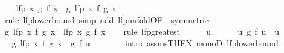 \begin{isabellebody}
\ \ \isamarkupfalse%
\ {\isachardoublequoteopen}lfp\ {\isacharparenleft}{\kern0pt}{\isasymlambda}x{\isachardot}{\kern0pt}\ g\ {\isacharparenleft}{\kern0pt}f\ x{\isacharparenright}{\kern0pt}{\isacharparenright}{\kern0pt}\ {\isasymle}\ g\ {\isacharparenleft}{\kern0pt}lfp\ {\isacharparenleft}{\kern0pt}{\isasymlambda}x{\isachardot}{\kern0pt}\ f\ {\isacharparenleft}{\kern0pt}g\ x{\isacharparenright}{\kern0pt}{\isacharparenright}{\kern0pt}{\isacharparenright}{\kern0pt}{\isachardoublequoteclose}\isanewline
\ \ \ \ \isamarkupfalse%
\ {\isacharparenleft}{\kern0pt}rule\ lfp{\isacharunderscore}{\kern0pt}lowerbound{\isacharparenright}{\kern0pt}\ {\isacharparenleft}{\kern0pt}simp\ add{\isacharcolon}{\kern0pt}\ lfp{\isacharunderscore}{\kern0pt}unfold{\isacharbrackleft}{\kern0pt}OF\ {\isacharasterisk}{\kern0pt}{\isacharcomma}{\kern0pt}\ symmetric{\isacharbrackright}{\kern0pt}{\isacharparenright}{\kern0pt}\isanewline
\ \ \isamarkupfalse%
\ {\isachardoublequoteopen}g\ {\isacharparenleft}{\kern0pt}lfp\ {\isacharparenleft}{\kern0pt}{\isasymlambda}x{\isachardot}{\kern0pt}\ f\ {\isacharparenleft}{\kern0pt}g\ x{\isacharparenright}{\kern0pt}{\isacharparenright}{\kern0pt}{\isacharparenright}{\kern0pt}\ {\isasymle}\ lfp\ {\isacharparenleft}{\kern0pt}{\isasymlambda}x{\isachardot}{\kern0pt}\ g\ {\isacharparenleft}{\kern0pt}f\ x{\isacharparenright}{\kern0pt}{\isacharparenright}{\kern0pt}{\isachardoublequoteclose}\isanewline
\ \ \isamarkupfalse%
\ {\isacharparenleft}{\kern0pt}rule\ lfp{\isacharunderscore}{\kern0pt}greatest{\isacharparenright}{\kern0pt}\isanewline
\ \ \ \ \isamarkupfalse%
\ u\isanewline
\ \ \ \ \isamarkupfalse%
\ u{\isacharcolon}{\kern0pt}\ {\isachardoublequoteopen}g\ {\isacharparenleft}{\kern0pt}f\ u{\isacharparenright}{\kern0pt}\ {\isasymle}\ u{\isachardoublequoteclose}\isanewline
\ \ \ \ \isamarkupfalse%
\ \isamarkupfalse%
\ {\isachardoublequoteopen}g\ {\isacharparenleft}{\kern0pt}lfp\ {\isacharparenleft}{\kern0pt}{\isasymlambda}x{\isachardot}{\kern0pt}\ f\ {\isacharparenleft}{\kern0pt}g\ x{\isacharparenright}{\kern0pt}{\isacharparenright}{\kern0pt}{\isacharparenright}{\kern0pt}\ {\isasymle}\ g\ {\isacharparenleft}{\kern0pt}f\ u{\isacharparenright}{\kern0pt}{\isachardoublequoteclose}\isanewline
\ \ \ \ \ \ \isamarkupfalse%
\ {\isacharparenleft}{\kern0pt}intro\ assms{\isacharbrackleft}{\kern0pt}THEN\ monoD{\isacharbrackright}{\kern0pt}\ lfp{\isacharunderscore}{\kern0pt}lowerbound{\isacharparenright}{\kern0pt}\isanewline

\end{isabellebody}
